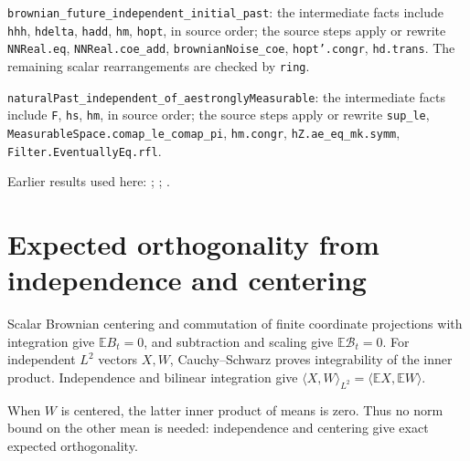 \documentclass[11pt,a4paper]{article}
\begin{document}
\begin{leanbox}
\texttt{brownian\_\allowbreak{}future\_\allowbreak{}independent\_\allowbreak{}initial\_\allowbreak{}past}: the intermediate facts include \texttt{hhh}, \texttt{hdelta}, \texttt{hadd}, \texttt{hm}, \texttt{hopt}, in source order; the source steps apply or rewrite \texttt{NNReal.\allowbreak{}eq}, \texttt{NNReal.\allowbreak{}coe\_\allowbreak{}add}, \texttt{brownian\allowbreak{}Noise\_\allowbreak{}coe}, \texttt{hopt'.\allowbreak{}congr}, \texttt{hd.\allowbreak{}trans}. The remaining scalar rearrangements are checked by \texttt{ring}.



\texttt{natural\allowbreak{}Past\_\allowbreak{}independent\_\allowbreak{}of\_\allowbreak{}aestrongly\allowbreak{}Measurable}: the intermediate facts include \texttt{F}, \texttt{hs}, \texttt{hm}, in source order; the source steps apply or rewrite \texttt{sup\_\allowbreak{}le}, \texttt{Measurable\allowbreak{}Space.\allowbreak{}comap\_\allowbreak{}le\_\allowbreak{}comap\_\allowbreak{}pi}, \texttt{hm.\allowbreak{}congr}, \texttt{h\allowbreak{}Z.\allowbreak{}ae\_\allowbreak{}eq\_\allowbreak{}mk.\allowbreak{}symm}, \texttt{Filter.\allowbreak{}Eventually\allowbreak{}Eq.\allowbreak{}rfl}.
\end{leanbox}


Earlier results used here: \cite[Section~3.24.8]{LangevinLean2026ULASC}; \cite[Section~3.25.1]{LangevinLean2026ULASC}; \cite[Section~3.54.4]{LangevinLean2026ULASC}.

\section{\texorpdfstring{Expected orthogonality from independence and centering}{Expected orthogonality from independence and centering}}


Scalar Brownian centering and commutation of finite coordinate projections with integration give \(\mathbb E B_t=0\), and subtraction and scaling give \(\mathbb E\mathcal B_t=0\). For independent \(L^2\) vectors \(X,W\), Cauchy–Schwarz proves integrability of the inner product. Independence and bilinear integration give \(\langle X,W\rangle_{L^2}=\langle\mathbb E X,\mathbb E W\rangle\).



When \(W\) is centered, the latter inner product of means is zero. Thus no norm bound on the other mean is needed: independence and centering give exact expected orthogonality.
\end{document}
